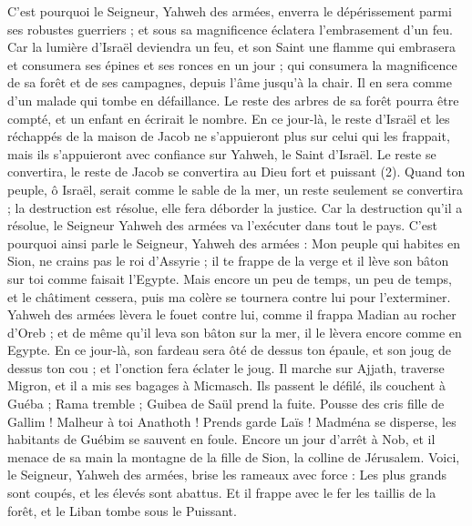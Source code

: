 \begin{multicols}{2}
C'est pourquoi le Seigneur, Yahweh des armées, enverra le dépérissement parmi ses robustes guerriers ; et sous sa magnificence éclatera l’embrasement d’un feu.
Car la lumière d'Israël deviendra un feu, et son Saint une flamme qui embrasera et consumera ses épines et ses ronces en un jour ;
qui consumera la magnificence de sa forêt et de ses campagnes, depuis l'âme jusqu'à la chair. Il en sera comme d’un malade qui tombe en défaillance.
Le reste des arbres de sa forêt pourra être compté, et un enfant en écrirait le nombre.
En ce jour-là, le reste d'Israël et les réchappés de la maison de Jacob ne s'appuieront plus sur celui qui les frappait, mais ils s'appuieront avec confiance sur Yahweh, le Saint d'Israël.
Le reste se convertira, le reste de Jacob se convertira au Dieu fort et puissant (2).
Quand ton peuple, ô Israël, serait comme le sable de la mer, un reste seulement se convertira ; la destruction est résolue, elle fera déborder la justice.
Car la destruction qu’il a résolue, le Seigneur Yahweh des armées va l’exécuter dans tout le pays.
C'est pourquoi ainsi parle le Seigneur, Yahweh des armées : Mon peuple qui habites en Sion, ne crains pas le roi d'Assyrie ; il te frappe de la verge et il lève son bâton sur toi comme faisait l’Egypte.
Mais encore un peu de temps, un peu de temps, et le châtiment cessera, puis ma colère se tournera contre lui pour l’exterminer.
Yahweh des armées lèvera le fouet contre lui, comme il frappa Madian au rocher d'Oreb ; et de même qu’il leva son bâton sur la mer, il le lèvera encore comme en Egypte.
En ce jour-là, son fardeau sera ôté de dessus ton épaule, et son joug de dessus ton cou ; et l’onction fera éclater le joug.
Il marche sur Ajjath, traverse Migron, et il a mis ses bagages à Micmasch.
Ils passent le défilé, ils couchent à Guéba ; Rama tremble ; Guibea de Saül prend la fuite.
Pousse des cris fille de Gallim ! Malheur à toi Anathoth ! Prends garde Laïs !
Madména se disperse, les habitants de Guébim se sauvent en foule.
Encore un jour d’arrêt à Nob, et il menace de sa main la montagne de la fille de Sion, la colline de Jérusalem.
Voici, le Seigneur, Yahweh des armées, brise les rameaux avec force : Les plus grands sont coupés, et les élevés sont abattus.
Et il frappe avec le fer les taillis de la forêt, et le Liban tombe sous le Puissant.

\end{multicols}
